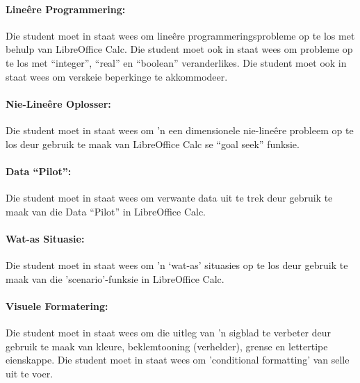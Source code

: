         \paragraph{Line\^{e}re Programmering:}
            Die student moet in staat wees om line\^{e}re programmeringsprobleme
            op te los met behulp van LibreOffice Calc. Die student
            moet ook in staat wees om probleme op te los met ``integer'', ``real''
            en ``boolean'' veranderlikes.  Die student moet ook in staat wees om 
            verskeie beperkinge te akkommodeer.

        \paragraph{Nie-Line\^{e}re Oplosser:}
            Die student moet in staat wees om 'n een dimensionele nie-line\^{e}re 
            probleem op te los deur gebruik te maak van LibreOffice Calc se 
            ``goal seek'' funksie.

        \paragraph{Data ``Pilot'':}
    Die student moet in staat wees om verwante data uit te trek 
    deur gebruik te maak van die Data ``Pilot'' in LibreOffice Calc.

        \paragraph{Wat-as Situasie:}
            Die student moet in staat wees om 'n `wat-as' situasies op te los 
            deur gebruik te maak van die 'scenario'-funksie  in LibreOffice Calc.

        \paragraph{Visuele Formatering:}
            Die student moet in staat wees om die uitleg van 'n sigblad te verbeter
            deur gebruik te maak van kleure, beklemtooning (verhelder), grense en lettertipe
            eienskappe.  Die student moet in staat wees om 'conditional formatting' 
            van selle uit te voer.
